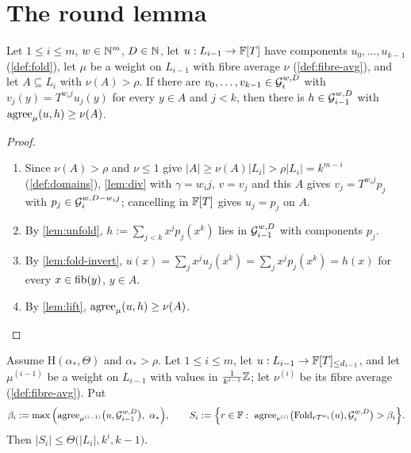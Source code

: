 \section{The round lemma}

\begin{lemma}[Descent]\label{lem:round-up}
Let $1\le i\le m$, $w\in\mathbb{N}^m$, $D\in\mathbb{N}$, let $u:L_{i-1}\to\mathbb{F}[T]$ have components
$u_0,\dots,u_{k-1}$ (\cref{def:fold}), let $\mu$ be a weight on $L_{i-1}$ with fibre average $\nu$
(\cref{def:fibre-avg}), and let $A\subseteq L_i$ with $\nu(A)>\rho$. If there are
$v_0,\dots,v_{k-1}\in\mathcal{G}_i^{w,D}$ with $v_j(y)=T^{w_ij}u_j(y)$ for every $y\in A$ and $j<k$, then
there is $h\in\mathcal{G}_{i-1}^{w,D}$ with $\mathrm{agree}_\mu(u,h)\ge\nu(A)$.
\end{lemma}

\begin{proof}\begin{enumerate}
\item Since $\nu(A)>\rho$ and $\nu\le1$ give $|A|\ge\nu(A)|L_i|>\rho|L_i|=k^{m-i}$
(\cref{def:domains}), \cref{lem:div} with $\gamma=w_ij$, $v=v_j$ and this $A$ gives $v_j=T^{w_ij}p_j$
with $p_j\in\mathcal{G}_i^{w,D-w_ij}$; cancelling in $\mathbb{F}[T]$ gives $u_j=p_j$ on $A$.
\item By \cref{lem:unfold}, $h:=\sum_{j<k}x^jp_j(x^k)$ lies in $\mathcal{G}_{i-1}^{w,D}$ with components
$p_j$.
\item By \cref{lem:fold-invert}, $u(x)=\sum_jx^ju_j(x^k)=\sum_jx^jp_j(x^k)=h(x)$ for every
$x\in\mathrm{fib}(y)$, $y\in A$.
\item By \cref{lem:lift}, $\mathrm{agree}_\mu(u,h)\ge\nu(A)$.
\end{enumerate}\end{proof}

\begin{lemma}\label{lem:round}
Assume $\mathrm H(\alpha_*,\Theta)$ and $\alpha_*>\rho$. Let $1\le i\le m$, let $u:L_{i-1}\to\mathbb{F}[T]_{\le d_{i-1}}$,
and let $\mu^{(i-1)}$ be a weight on $L_{i-1}$ with values in $\frac1{k^{i-1}}\mathbb{Z}$; let
$\nu^{(i)}$ be its fibre average (\cref{def:fibre-avg}). Put
\[
\beta_i:=\max\Big(\agree_{\mu^{(i-1)}}\big(u,\Gc_{i-1}^{w,D}\big),\ \alpha_*\Big),\qquad
S_i:=\Big\{r\in\F:\ \agree_{\nu^{(i)}}\big(\Fold_{rT^{w_i}}(u),\Gc_i^{w,D}\big)>\beta_i\Big\}.
\]
Then $|S_i|\le\Theta\big(|L_i|,k^i,k-1\big)$.
\end{lemma}

